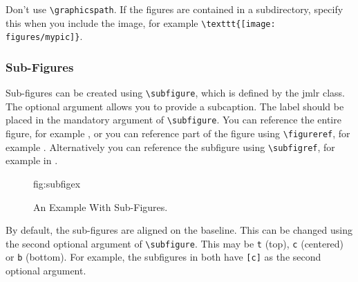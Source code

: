 \documentclass[pmlr]{jmlr}%
\begin{document}
Don't use \verb|\graphicspath|. If the figures are contained in
a subdirectory, specify this when you include the image, for
example \verb|\texttt{[image: figures/mypic]}|.

\subsubsection{Sub-Figures}
\label{sec:subfigures}

Sub-figures can be created using \verb|\subfigure|, which is
defined by the \textsf{jmlr} class. The optional argument allows
you to provide a subcaption. The label should be placed in the
mandatory argument of \verb|\subfigure|. You can reference the
entire figure, for example , or you can
reference part of the figure using \verb|\figureref|, for example
. Alternatively you can reference the
subfigure using \verb|\subfigref|, for example
 in .

\begin{figure}[htbp]
\floatconts
  {fig:subfigex}
  {\caption{An Example With Sub-Figures.}}
  {%
    \qquad
  }
\end{figure}

By default, the sub-figures are aligned on the baseline.
This can be changed using the second optional argument
of \verb|\subfigure|. This may be \texttt{t} (top), \texttt{c}
(centered) or \texttt{b} (bottom). For example, the subfigures
 in 
both have \verb|[c]| as the second optional argument.
\end{document}
